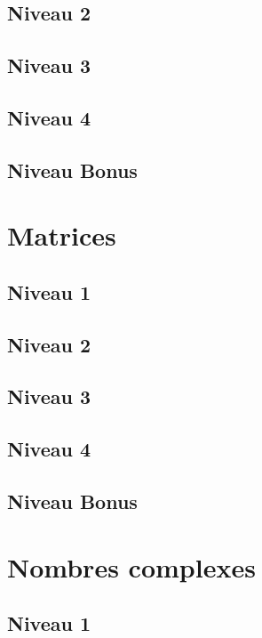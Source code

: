 \documentclass[a4paper]{report}
\begin{document}
			\subsection{Niveau 2}
		
			\subsection{Niveau 3}
			
			\subsection{Niveau 4}
			
			\subsection{Niveau Bonus}
		
		\section{Matrices}
		
			\subsection{Niveau 1}
		
			\subsection{Niveau 2}
		
			\subsection{Niveau 3}
			
			\subsection{Niveau 4}
			
			\subsection{Niveau Bonus}
		
		\section{Nombres complexes}
		
			\subsection{Niveau 1}
		
\end{document}
